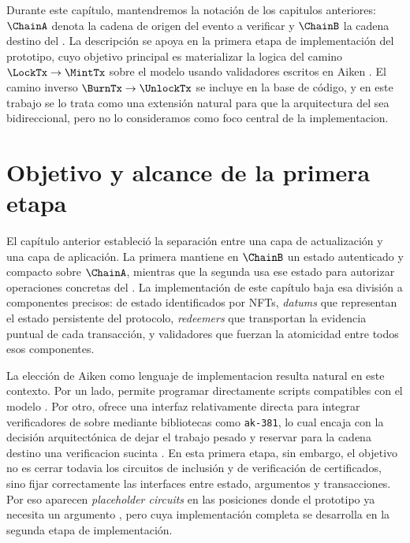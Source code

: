 
Durante este capítulo, mantendremos la notación de los capitulos anteriores: $\ChainA$ denota la cadena de origen del evento a verificar y $\ChainB$ la cadena destino del \zkBridge. La descripción se apoya en la primera etapa de implementación del prototipo, cuyo objetivo principal es materializar la logica \Onchain del camino $\LockTx \rightarrow \MintTx$ sobre el modelo \eUTxO usando validadores escritos en Aiken \cite{aiken2026, Chakravarty2020}. El camino inverso $\BurnTx \rightarrow \UnlockTx$ se incluye en la base de código, y en este trabajo se lo trata como una extensión natural para que la arquitectura del \zkBridge sea bidireccional, pero no lo consideramos como foco central de la implementacion.

\section{Objetivo y alcance de la primera etapa}

El capítulo anterior estableció la separación entre una capa de actualización y una capa de aplicación. La primera mantiene en $\ChainB$ un estado autenticado y compacto sobre $\ChainA$, mientras que la segunda usa ese estado para autorizar operaciones concretas del \Bridge. La implementación de este capítulo baja esa división a componentes precisos: \UTxOs de estado identificados por NFTs, \textit{datums} que representan el estado persistente del protocolo, \textit{redeemers} que transportan la evidencia puntual de cada transacción, y validadores que fuerzan la atomicidad entre todos esos componentes.

La elección de Aiken como lenguaje de implementacion resulta natural en este contexto. Por un lado, permite programar directamente scripts compatibles con el modelo \eUTxO. Por otro, ofrece una interfaz relativamente directa para integrar verificadores de \Groth sobre \BLS mediante bibliotecas como \texttt{ak-381}, lo cual encaja con la decisión arquitectónica de dejar el trabajo pesado \Offchain y reservar para la cadena destino una verificacion sucinta \cite{CIP0381, IOGPlutusV3, AK381Repo}. En esta primera etapa, sin embargo, el objetivo no es cerrar todavia los circuitos de inclusión y de verificación de certificados, sino fijar correctamente las interfaces entre estado, argumentos y transacciones. Por eso aparecen \textit{placeholder circuits} en las posiciones donde el prototipo ya necesita un argumento \ZK, pero cuya implementación completa se desarrolla en la segunda etapa de implementación.


